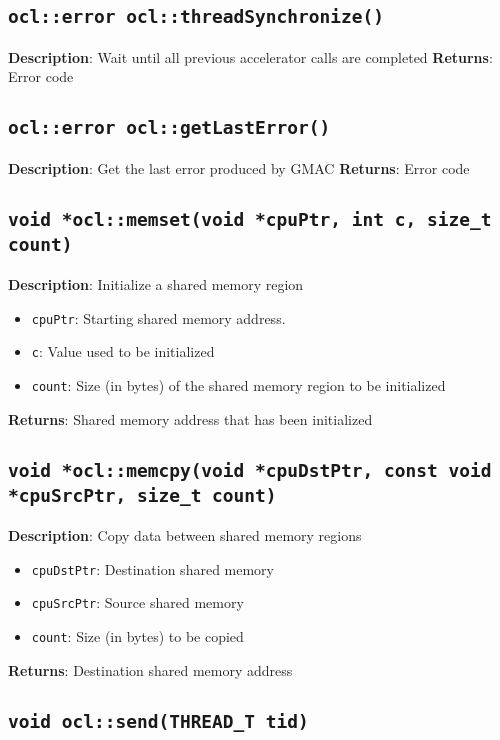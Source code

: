 \subsection{\texttt{ocl::error ocl::threadSynchronize()}}

\textbf{Description}: Wait until all previous accelerator calls are completed
\textbf{Returns}: Error code

\subsection{\texttt{ocl::error ocl::getLastError()}}

\textbf{Description}: Get the last error produced by GMAC
\textbf{Returns}: Error code

\subsection{\texttt{void *ocl::memset(void *cpuPtr, int c, size\_t count)}}

\textbf{Description}: Initialize a shared memory region
\begin{itemize}
  \item \texttt{cpuPtr}: Starting shared memory address.
  \item \texttt{c}: Value used to be initialized
  \item \texttt{count}: Size (in bytes) of the shared memory region to be initialized
\end{itemize}
\textbf{Returns}: Shared memory address that has been initialized

\subsection{\texttt{void *ocl::memcpy(void *cpuDstPtr, const void *cpuSrcPtr, size\_t count)}}

\textbf{Description}: Copy data between shared memory regions
\begin{itemize}
  \item \texttt{cpuDstPtr}: Destination shared memory
  \item \texttt{cpuSrcPtr}: Source shared memory
  \item \texttt{count}: Size (in bytes) to be copied
\end{itemize}
\textbf{Returns}: Destination shared memory address

\subsection{\texttt{void ocl::send(THREAD\_T tid)}}

